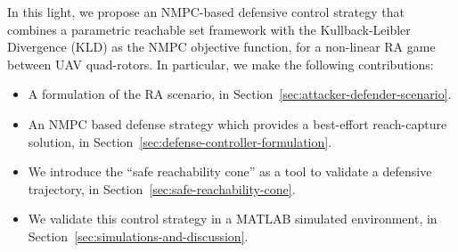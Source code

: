 \documentclass[letterpaper,10pt,conference]{ieeeconf}
\begin{document}
In this light, we propose an NMPC-based defensive control strategy that combines a parametric reachable set framework with the Kullback-Leibler Divergence (KLD) as the NMPC objective function, for a non-linear RA game between UAV quad-rotors. In particular, we make the following contributions:
\begin{itemize}
    \item A formulation of the RA scenario, in Section~\ref{sec:attacker-defender-scenario}.
    \item An NMPC based defense strategy which provides a best-effort reach-capture solution, in Section~\ref{sec:defense-controller-formulation}.
    \item We introduce the ``safe reachability cone'' as a tool to validate a defensive trajectory, in Section~\ref{sec:safe-reachability-cone}.
    \item We validate this control strategy in a MATLAB simulated environment, in Section~\ref{sec:simulations-and-discussion}.
\end{itemize}
%
%





\end{document}
